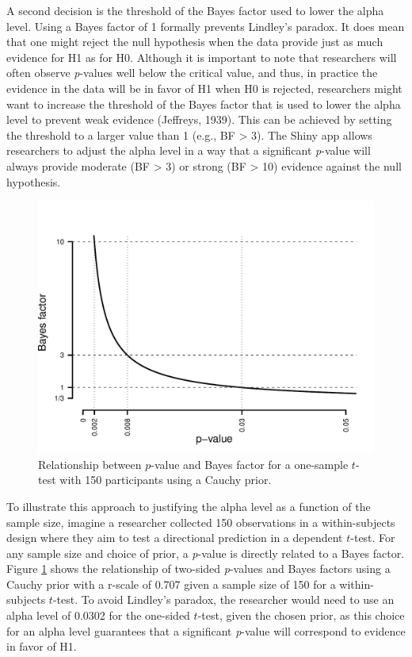 \documentclass[
  english,
  ,man, a4paper,floatsintext]{apa6}
\begin{document}
A second decision is the threshold of the Bayes factor used to lower the alpha level. Using a Bayes factor of 1 formally prevents Lindley's paradox. It does mean that one might reject the null hypothesis when the data provide just as much evidence for H1 as for H0. Although it is important to note that researchers will often observe \emph{p}-values well below the critical value, and thus, in practice the evidence in the data will be in favor of H1 when H0 is rejected, researchers might want to increase the threshold of the Bayes factor that is used to lower the alpha level to prevent weak evidence (Jeffreys, 1939). This can be achieved by setting the threshold to a larger value than 1 (e.g., BF \textgreater{} 3). The Shiny app allows researchers to adjust the alpha level in a way that a significant \emph{p}-value will always provide moderate (BF \textgreater{} 3) or strong (BF \textgreater{} 10) evidence against the null hypothesis.

\begin{figure}
\centering
\includegraphics{Justify_in_Practice_files/figure-latex/Lindley150-1.pdf}
\caption{\label{fig:Lindley150}Relationship between \(p\)-value and Bayes factor for a one-sample \(t\)-test with 150 participants using a Cauchy prior.}
\end{figure}

To illustrate this approach to justifying the alpha level as a function of the sample size, imagine a researcher collected 150 observations in a within-subjects design where they aim to test a directional prediction in a dependent \(t\)-test. For any sample size and choice of prior, a \emph{p}-value is directly related to a Bayes factor. Figure \ref{fig:Lindley150} shows the relationship of two-sided \emph{p}-values and Bayes factors using a Cauchy prior with a r-scale of 0.707 given a sample size of 150 for a within-subjects \(t\)-test. To avoid Lindley's paradox, the researcher would need to use an alpha level of 0.0302 for the one-sided \(t\)-test, given the chosen prior, as this choice for an alpha level guarantees that a significant \emph{p}-value will correspond to evidence in favor of H1.
\end{document}
